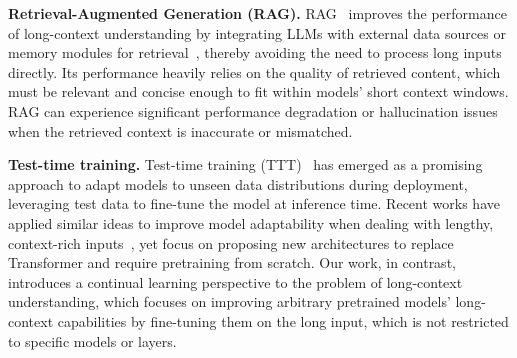 \textbf{Retrieval-Augmented Generation (RAG). } RAG~\citep{lewis2020retrieval} improves the performance of long-context understanding by integrating LLMs with external data sources or memory modules for retrieval~\citep{xu2023retrieval, jiang2024longrag, wang2024augmenting, jin2024llm}, thereby avoiding the need to process long inputs directly. Its performance heavily relies on the quality of retrieved content, which must be relevant and concise enough to fit within models' short context windows. RAG can experience significant performance degradation or hallucination issues when the retrieved context is inaccurate or mismatched.

\textbf{Test-time training. } Test-time training (TTT)~\citep{liu2021ttt++, gandelsman2022test, osowiechi2023tttflow,hong2023mecta} has emerged as a promising approach to adapt models to unseen data distributions during deployment, leveraging test data to fine-tune the model at inference time. Recent works have applied similar ideas to improve model adaptability when dealing with lengthy, context-rich inputs~\citep{sun2024learning,behrouz2024titans}, yet focus on proposing new architectures to replace Transformer and require pretraining from scratch. Our work, in contrast, introduces a continual learning perspective to the problem of long-context understanding, which focuses on improving arbitrary pretrained models' long-context capabilities by fine-tuning them on the long input, which is not restricted to specific models or layers. %



